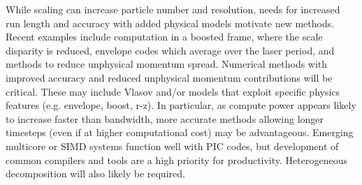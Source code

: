 While scaling can increase particle number and resolution, needs for increased run length and accuracy with added physical models motivate new methods.  Recent examples include computation in a boosted frame, where the scale disparity is reduced, envelope codes which average over the laser period, and methods to reduce unphysical momentum spread.  Numerical methods with improved accuracy and reduced unphysical momentum contributions will be critical.  These may include Vlasov and/or models that exploit specific physics features (e.g. envelope, boost, r-z).  In particular, as compute power appears likely to increase faster than bandwidth, more accurate methods allowing longer timesteps (even if at higher computational cost) may be advantageous. Emerging multicore or SIMD systems function well with PIC codes, but development of common compilers and tools are a high priority for productivity.  Heterogeneous decomposition will also likely be required.

